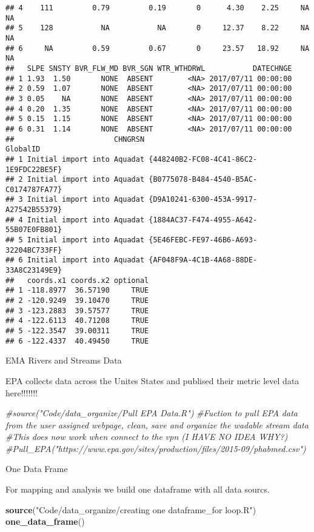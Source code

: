 \documentclass[]{article}
\newenvironment{Shaded}{\begin{snugshade}}{\end{snugshade}}
\newcommand{\CommentTok}[1]{\textcolor[rgb]{0.56,0.35,0.01}{\textit{#1}}}
\newcommand{\KeywordTok}[1]{\textcolor[rgb]{0.13,0.29,0.53}{\textbf{#1}}}
\newcommand{\NormalTok}[1]{#1}
\newcommand{\StringTok}[1]{\textcolor[rgb]{0.31,0.60,0.02}{#1}}
\begin{document}
\begin{verbatim}
## 4    111         0.79         0.19       0      4.30    2.25     NA     NA
## 5    128           NA           NA       0     12.37    8.22     NA     NA
## 6     NA         0.59         0.67       0     23.57   18.92     NA     NA
##   SLPE SNSTY BVR_FLW_MD BVR_SGN WTR_WTHDRWL           DATECHNGE
## 1 1.93  1.50       NONE  ABSENT        <NA> 2017/07/11 00:00:00
## 2 0.59  1.07       NONE  ABSENT        <NA> 2017/07/11 00:00:00
## 3 0.05    NA       NONE  ABSENT        <NA> 2017/07/11 00:00:00
## 4 0.20  1.35       NONE  ABSENT        <NA> 2017/07/11 00:00:00
## 5 0.15  1.15       NONE  ABSENT        <NA> 2017/07/11 00:00:00
## 6 0.31  1.14       NONE  ABSENT        <NA> 2017/07/11 00:00:00
##                       CHNGRSN                               GlobalID
## 1 Initial import into Aquadat {448240B2-FC08-4C41-86C2-1E9FDC22BE5F}
## 2 Initial import into Aquadat {B0775078-B484-4540-B5AC-C0174787FA77}
## 3 Initial import into Aquadat {D9A10241-6300-453A-9917-A27542B55379}
## 4 Initial import into Aquadat {1884AC37-F474-4955-A642-55B07E0FB801}
## 5 Initial import into Aquadat {5E46FEBC-FE97-46B6-A693-32204BC733FF}
## 6 Initial import into Aquadat {AF048F9A-4C1B-4A68-88DE-33A8C23149E9}
##   coords.x1 coords.x2 optional
## 1 -118.8977  36.57190     TRUE
## 2 -120.9249  39.10470     TRUE
## 3 -123.2883  39.57577     TRUE
## 4 -122.6113  40.71208     TRUE
## 5 -122.3547  39.00311     TRUE
## 6 -122.4337  40.49450     TRUE
\end{verbatim}

EMA Rivers and Streams Data

EPA collects data across the Unites States and publised their metric
level data here!!!!!!!

\begin{Shaded}
\begin{Highlighting}[]
\CommentTok{#source("Code/data_organize/Pull EPA Data.R")}
\CommentTok{#Fuction to pull EPA data from the user assigned webpage, clean, save and organize the wadable stream data}
\CommentTok{#This does now work when connect to the vpn (I HAVE NO IDEA WHY?)}
\CommentTok{#Pull_EPA("https://www.epa.gov/sites/production/files/2015-09/phabmed.csv") }
\end{Highlighting}
\end{Shaded}

One Data Frame

For mapping and analysis we build one dataframe with all data sourcs.

\begin{Shaded}
\begin{Highlighting}[]
\KeywordTok{source}\NormalTok{(}\StringTok{"Code/data_organize/creating one dataframe_for loop.R"}\NormalTok{)}
\KeywordTok{one_data_frame}\NormalTok{()}
\end{Highlighting}
\end{Shaded}
\end{document}
